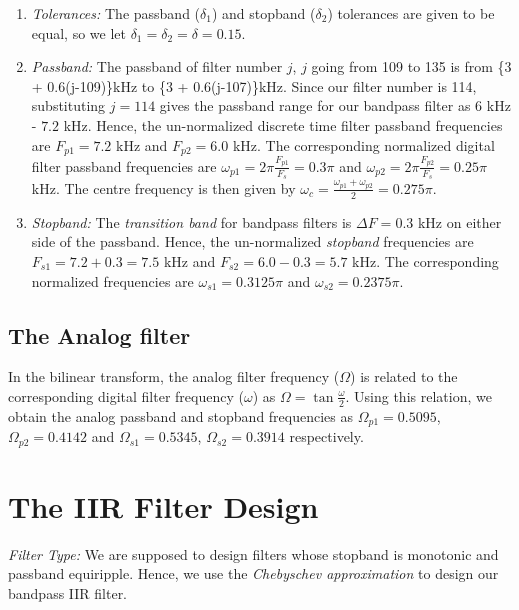 \documentclass[journal,12pt,twocolumn]{IEEEtran}
\begin{document}
\begin{enumerate}
\item {\em Tolerances:}  The passband ($\delta_1$) and stopband ($\delta_2$) tolerances are given to
be equal, so we let $\delta_1 = \delta_2 = \delta = 0.15$.

\item {\em Passband:}  The passband of filter number $j$, $j$ going from 109 to 135 is from \{3 + 0.6(j-109)\}kHz
to \{3 + 0.6(j-107)\}kHz.  Since our filter number is 114, substituting $j = 114$ gives the passband
range for our bandpass filter as $6$ kHz - $7.2$ kHz.  Hence, the un-normalized discrete time filter
passband frequencies are $F_{p1} = 7.2$ kHz
and $F_{p2} = 6.0$ kHz.  The corresponding normalized digital filter passband frequencies are
$\omega_{p1} = 2\pi\frac{F_{p1}}{F_s}  = 0.3\pi$  and $\omega_{p2} = 2\pi\frac{F_{p2}}{F_s}  = 0.25 \pi$ kHz.  The centre frequency is then given by  $\omega_c = \frac{\omega_{p1} + \omega_{p2}}{2} = 0.275\pi$.  

\item {\em Stopband:}  The {\em transition band} for bandpass filters is $\Delta F = 0.3$ kHz on either side of the passband.
Hence, the un-normalized {\em stopband} frequencies are $F_{s1} = 7.2 + 0.3 = 7.5$ kHz and $F	_{s2} = 6.0 - 0.3 = 5.7$ kHz.  The corresponding normalized frequencies are $\omega_{s1} = 0.3125 \pi$  and $\omega_{s2} =  0.2375 \pi$.
\end{enumerate}

\subsection{The Analog filter}
In the bilinear transform, the analog filter frequency ($\Omega$) is related to the corresponding digital filter frequency ($\omega$) as $\Omega = \tan \frac{\omega}{2}$.  Using this relation, we obtain the analog passband and stopband frequencies as $\Omega_{p1} = 0.5095$, $\Omega_{p2} = 0.4142$ and $\Omega_{s1} = 0.5345$, $\Omega_{s2} = 0.3914$
respectively.

\section{The IIR Filter Design}
{\em Filter Type:}  We are supposed to design filters whose stopband is monotonic and passband equiripple.  
Hence, we use the {\em Chebyschev approximation} to design our bandpass IIR filter.
\end{document}
